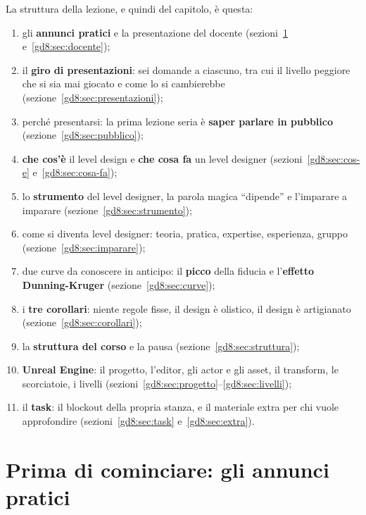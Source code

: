 La struttura della lezione, e quindi del capitolo, è questa:
\begin{enumerate}
  \item gli \textbf{annunci pratici} e la presentazione del docente
        (sezioni~\ref{gd8:sec:annunci} e~\ref{gd8:sec:docente});
  \item il \textbf{giro di presentazioni}: sei domande a ciascuno, tra cui
        il livello peggiore che si sia mai giocato e come lo si
        cambierebbe (sezione~\ref{gd8:sec:presentazioni});
  \item perché presentarsi: la prima lezione seria è \textbf{saper parlare
        in pubblico} (sezione~\ref{gd8:sec:pubblico});
  \item \textbf{che cos'è} il level design e \textbf{che cosa fa} un level
        designer (sezioni~\ref{gd8:sec:cos-e} e~\ref{gd8:sec:cosa-fa});
  \item lo \textbf{strumento} del level designer, la parola magica
        ``dipende'' e l'imparare a imparare
        (sezione~\ref{gd8:sec:strumento});
  \item come si diventa level designer: teoria, pratica, expertise,
        esperienza, gruppo (sezione~\ref{gd8:sec:imparare});
  \item due curve da conoscere in anticipo: il \textbf{picco} della
        fiducia e l'\textbf{effetto Dunning-Kruger}
        (sezione~\ref{gd8:sec:curve});
  \item i \textbf{tre corollari}: niente regole fisse, il design è olistico,
        il design è artigianato (sezione~\ref{gd8:sec:corollari});
  \item la \textbf{struttura del corso} e la pausa
        (sezione~\ref{gd8:sec:struttura});
  \item \textbf{Unreal Engine}: il progetto, l'editor, gli actor e gli asset,
        il transform, le scorciatoie, i livelli
        (sezioni~\ref{gd8:sec:progetto}--\ref{gd8:sec:livelli});
  \item il \textbf{task}: il blockout della propria stanza, e il materiale
        extra per chi vuole approfondire
        (sezioni~\ref{gd8:sec:task} e~\ref{gd8:sec:extra}).
\end{enumerate}

\section{Prima di cominciare: gli annunci pratici}
\label{gd8:sec:annunci}

